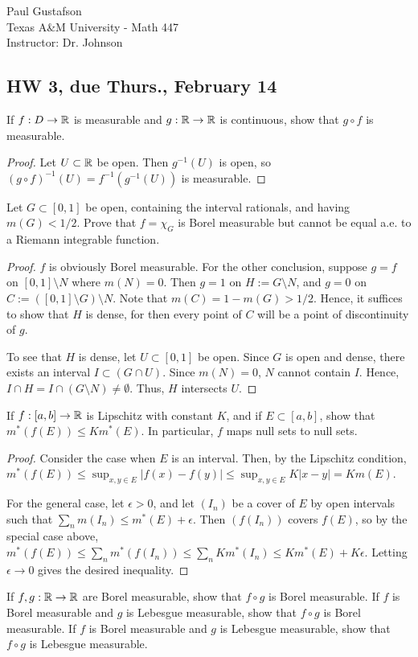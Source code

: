 \documentclass{article}
\begin{document}
\noindent Paul Gustafson\\
\noindent Texas A\&M University - Math 447\\ 
\noindent Instructor: Dr. Johnson

\subsection*{HW 3, due Thurs., February 14}
 If $f: D\to \mathbb{R}$ is measurable and $g: \mathbb{R} \to \mathbb{R}$ is continuous, show that $g \circ f$ is measurable.
\begin{proof}
Let $U \subset \mathbb{R}$ be open.  Then $g^{-1}(U)$ is open, so $(g \circ f)^{-1}(U) = f^{-1}(g^{-1}(U))$ is measurable.
\end{proof}
 Let $G \subset [0,1]$ be open, containing the interval rationals, and having $m(G) < 1/2$. Prove that $f = \chi_G$ is Borel measurable but cannot be equal a.e. to a Riemann integrable function.
\begin{proof}
$f$ is obviously Borel measurable.  For the other conclusion, suppose $g = f$ on $[0,1]\setminus N$ where $m(N) = 0$. Then $g = 1$ on $H:=G \setminus N$, and $g=0$ on $C:= ([0,1]\setminus G)\setminus N$. Note that $m(C) = 1 - m(G) > 1/2$. Hence, it suffices to show that $H$ is dense, for then every point of $C$ will be a point of discontinuity of $g$.

To see that $H$ is dense, let $U \subset [0,1]$ be open.  Since $G$ is open and dense, there exists an interval $I \subset (G \cap U)$. Since $m(N) = 0$, $N$ cannot contain $I$. Hence, $I \cap H = I \cap (G\setminus N) \ne \emptyset$. Thus, $H$ intersects $U$.
\end{proof}
 If $f : [a,b] \to \mathbb{R}$ is Lipschitz with constant $K$, and if $E \subset [a,b]$, show that $m^*(f(E)) \le K m^*(E)$. In particular, $f$ maps null sets to null sets.
\begin{proof}
Consider the case when $E$ is an interval. Then, by the Lipschitz condition, $m^*(f(E)) \le \sup_{x,y \in E} |f(x) - f(y)| \le \sup_{x,y \in E} K |x-y| = K m(E)$.

For the general case, let $\epsilon > 0$, and let $(I_n)$ be a cover of $E$ by open intervals such that $\sum_n m(I_n) \le m^*(E) + \epsilon$. Then $(f(I_n))$ covers $f(E)$, so by the special case above, $m^*(f(E)) \le \sum_n m^*(f(I_n)) \le \sum_n K m^*(I_n) \le Km^*(E) + K\epsilon$.  Letting $\epsilon \to 0$ gives the desired inequality.
\end{proof}
 If $f,g: \mathbb{R} \to \mathbb{R}$ are Borel measurable, show that $f \circ g$ is Borel measurable. If $f$ is Borel measurable and $g$ is Lebesgue measurable, show that $f \circ g$ is Borel measurable.  If $f$ is Borel measurable and $g$ is Lebesgue measurable, show that $f \circ g$ is Lebesgue measurable.
\end{document}
